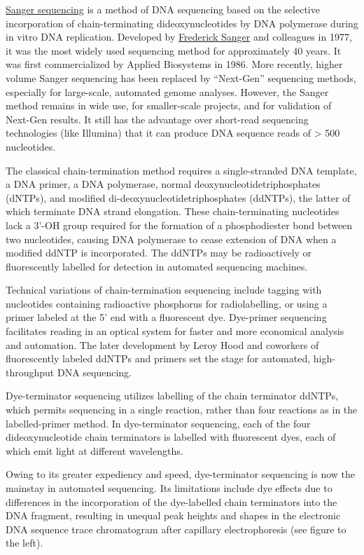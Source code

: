 \href{https://en.wikipedia.org/wiki/Sanger_sequencing}{Sanger sequencing} is a method of DNA sequencing based on the selective incorporation of chain-terminating dideoxynucleotides by DNA polymerase during in vitro DNA replication. Developed by \href{https://en.wikipedia.org/wiki/Frederick_Sanger}{Frederick Sanger} and colleagues in 1977, it was the most widely used sequencing method for approximately 40 years. It was first commercialized by Applied Biosystems in 1986. More recently, higher volume Sanger sequencing has been replaced by ``Next-Gen'' sequencing methods, especially for large-scale, automated genome analyses. However, the Sanger method remains in wide use, for smaller-scale projects, and for validation of Next-Gen results. It still has the advantage over short-read sequencing technologies (like Illumina) that it can produce DNA sequence reads of \textgreater{} 500 nucleotides.

The classical chain-termination method requires a single-stranded DNA template, a DNA primer, a DNA polymerase, normal deoxynucleotidetriphosphates (dNTPs), and modified di-deoxynucleotidetriphosphates (ddNTPs), the latter of which terminate DNA strand elongation. These chain-terminating nucleotides lack a 3'-OH group required for the formation of a phosphodiester bond between two nucleotides, causing DNA polymerase to cease extension of DNA when a modified ddNTP is incorporated. The ddNTPs may be radioactively or fluorescently labelled for detection in automated sequencing machines.

Technical variations of chain-termination sequencing include tagging with nucleotides containing radioactive phosphorus for radiolabelling, or using a primer labeled at the 5' end with a fluorescent dye. Dye-primer sequencing facilitates reading in an optical system for faster and more economical analysis and automation. The later development by Leroy Hood and coworkers of fluorescently labeled ddNTPs and primers set the stage for automated, high-throughput DNA sequencing.

Dye-terminator sequencing utilizes labelling of the chain terminator ddNTPs, which permits sequencing in a single reaction, rather than four reactions as in the labelled-primer method. In dye-terminator sequencing, each of the four dideoxynucleotide chain terminators is labelled with fluorescent dyes, each of which emit light at different wavelengths.

Owing to its greater expediency and speed, dye-terminator sequencing is now the mainstay in automated sequencing. Its limitations include dye effects due to differences in the incorporation of the dye-labelled chain terminators into the DNA fragment, resulting in unequal peak heights and shapes in the electronic DNA sequence trace chromatogram after capillary electrophoresis (see figure to the left).

